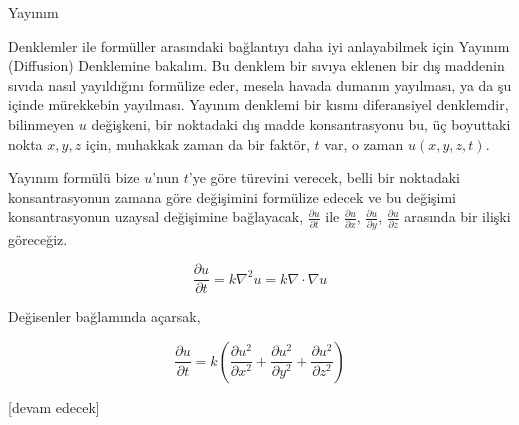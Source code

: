 \documentclass[12pt,fleqn]{article}\usepackage{../../common}
\begin{document}
Yayınım

Denklemler ile formüller arasındaki bağlantıyı daha iyi anlayabilmek için
Yayınım (Diffusion) Denklemine bakalım. Bu denklem bir sıvıya eklenen bir dış
maddenin sıvıda nasıl yayıldığını formülize eder, mesela havada dumanın
yayılması, ya da şu içinde mürekkebin yayılması. Yayınım denklemi bir kısmı
diferansiyel denklemdir, bilinmeyen $u$ değişkeni, bir noktadaki dış madde
konsantrasyonu bu, üç boyuttaki nokta $x,y,z$ için, muhakkak zaman da bir
faktör, $t$ var, o zaman $u(x,y,z,t)$.

Yayınım formülü bize $u$'nun $t$'ye göre türevini verecek, belli bir noktadaki
konsantrasyonun zamana göre değişimini formülize edecek ve bu değişimi
konsantrasyonun uzaysal değişimine bağlayacak, $\frac{\partial u}{\partial t}$
ile $\frac{\partial u}{\partial x}$, $\frac{\partial u}{\partial y}$,
$\frac{\partial u}{\partial z}$ arasında bir ilişki göreceğiz.

$$
\frac{\partial u}{\partial t} =
k \nabla^2 u =
k \nabla \cdot \nabla u
$$

Değisenler bağlamında açarsak,

$$
\frac{\partial u}{\partial t} = k \left(
\frac{\partial u^2}{\partial x^2} +
\frac{\partial u^2}{\partial y^2} +
\frac{\partial u^2}{\partial z^2}
\right)
$$




[devam edecek]
\end{document}
